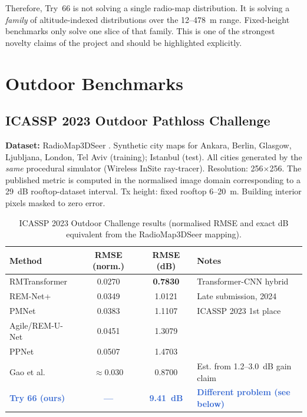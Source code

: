 \documentclass[11pt,a4paper]{article}
\newcommand{\better}[1]{\textcolor{good}{\textbf{#1}}}
\newcommand{\ours}[1]{\textcolor{highlight}{\textbf{#1}}}
\begin{document}
Therefore, Try~66 is not solving a single radio-map distribution. It is solving
a \emph{family} of altitude-indexed distributions over the 12--478~m range.
Fixed-height benchmarks only solve one slice of that family. This is one of the
strongest novelty claims of the project and should be highlighted explicitly.

\section{Outdoor Benchmarks}
\label{sec:outdoor}

\subsection{ICASSP 2023 Outdoor Pathloss Challenge}
\label{ssec:icassp2023}

\textbf{Dataset:} RadioMap3DSeer \cite{icassp2023challenge}. Synthetic city maps
for Ankara, Berlin, Glasgow, Ljubljana, London, Tel Aviv (training); Istanbul (test).
All cities generated by the \emph{same} procedural simulator (Wireless InSite
ray-tracer). Resolution: 256$\times$256. The published metric is computed in the
normalised image domain corresponding to a 29~dB rooftop-dataset interval.
Tx height: fixed rooftop 6--20~m. Building interior pixels masked to zero error.

\begin{table}[h!]
\centering
\caption{ICASSP 2023 Outdoor Challenge results (normalised RMSE and exact dB equivalent from the RadioMap3DSeer mapping).}
\label{tab:icassp2023}
\begin{tabular}{lccl}
\toprule
\textbf{Method} & \textbf{RMSE (norm.)} & \textbf{RMSE (dB)} & \textbf{Notes} \\
\midrule
RMTransformer \cite{rmtransformer2025} & 0.0270 & \better{0.7830} & Transformer-CNN hybrid \\
REM-Net+ \cite{remnet2024} & 0.0349 & 1.0121 & Late submission, 2024 \\
PMNet \cite{pmnet2023} & 0.0383 & 1.1107 & ICASSP 2023 1st place \\
Agile/REM-U-Net & 0.0451 & 1.3079 & \\
PPNet & 0.0507 & 1.4703 & \\
Gao et al.~\cite{gao2026} & $\approx$0.030 & 0.8700 & Est. from 1.2--3.0~dB gain claim \\
\midrule
\ours{Try 66 (ours)} & \ours{---} & \ours{9.41~dB} & \ours{Different problem (see below)} \\
\bottomrule
\end{tabular}
\end{table}
\end{document}
